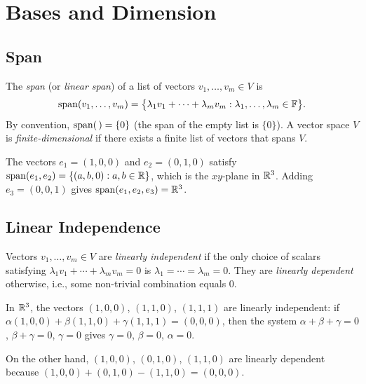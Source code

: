\documentclass[11pt,a4paper]{article}
\begin{document}
\section{Bases and Dimension}
\label{sec:bases_dimension}

\subsection{Span}

\begin{definition}[Span]
\label{def:span}
The \emph{span} (or \emph{linear span}) of a list of vectors
$v_1, \ldots, v_m \in V$ is
\[
  \operatorname{span}(v_1, \ldots, v_m)
  = \bigl\{\lambda_1 v_1 + \cdots + \lambda_m v_m
    : \lambda_1, \ldots, \lambda_m \in \mathbb{F}\bigr\}.
\]
By convention, $\operatorname{span}(\,) = \{0\}$ (the span of the empty list is $\{0\}$).
A vector space $V$ is \emph{finite-dimensional} if there exists a finite list
of vectors that spans $V$.
\end{definition}

\begin{example}[Span in $\R^3$]
\label{ex:span_R3}
The vectors $e_1 = (1,0,0)$ and $e_2 = (0,1,0)$ satisfy
$\operatorname{span}(e_1, e_2) = \{(a, b, 0) : a, b \in \mathbb{R}\}$, which is the $xy$-plane
in $\R^3$.  Adding $e_3 = (0,0,1)$ gives $\operatorname{span}(e_1, e_2, e_3) = \mathbb{R}^3$.
\end{example}

\subsection{Linear Independence}

\begin{definition}
\label{def:linear_independence}
Vectors $v_1, \ldots, v_m \in V$ are \emph{linearly independent} if the only
choice of scalars satisfying
$\lambda_1 v_1 + \cdots + \lambda_m v_m = 0$
is $\lambda_1 = \cdots = \lambda_m = 0$.  They are \emph{linearly dependent}
otherwise, i.e., some non-trivial combination equals $0$.
\end{definition}

\begin{example}
\label{ex:independence_test}
In $\R^3$, the vectors $(1,0,0)$, $(1,1,0)$, $(1,1,1)$ are linearly
independent: if $\alpha(1,0,0) + \beta(1,1,0) + \gamma(1,1,1) = (0,0,0)$,
then the system $\alpha + \beta + \gamma = 0$, $\beta + \gamma = 0$,
$\gamma = 0$ gives $\gamma = 0$, $\beta = 0$, $\alpha = 0$.

On the other hand, $(1,0,0)$, $(0,1,0)$, $(1,1,0)$ are linearly dependent
because $(1,0,0) + (0,1,0) - (1,1,0) = (0,0,0)$.
\end{example}
\end{document}
